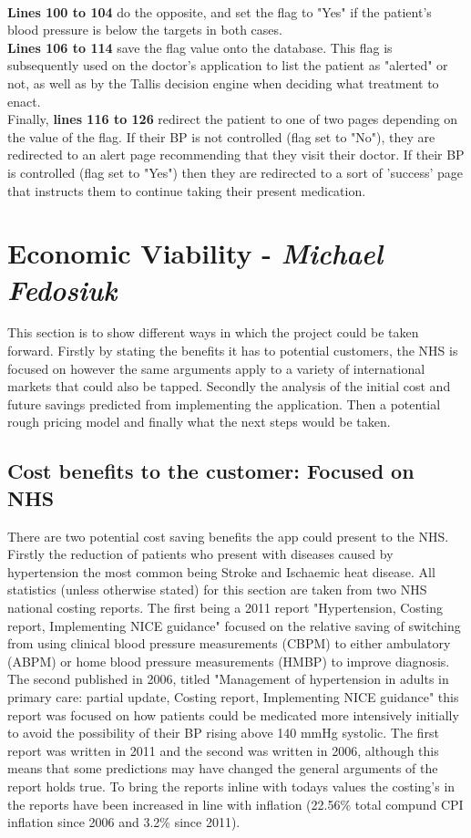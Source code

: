 \documentclass[11pt]{article}
\begin{document}
\\
\textbf{Lines 100 to 104} do the opposite, and set the flag to "Yes" if the patient's blood pressure is below the targets in both cases.
\\
\textbf{Lines 106 to 114} save the flag value onto the database. This flag is subsequently used on the doctor's application to list the patient as "alerted" or not, as well as by the Tallis decision engine when deciding what treatment to enact.
\\
Finally, \textbf{lines 116 to 126} redirect the patient to one of two pages depending on the value of the flag. If their BP is not controlled (flag set to "No"), they are redirected to an alert page recommending that they visit their doctor. If their BP is controlled (flag set to "Yes") then they are redirected to a sort of 'success' page that instructs them to continue taking their present medication.


\section{Economic Viability - \textit{Michael Fedosiuk}}
This section is to show different ways in which the project could be taken forward. Firstly by stating the benefits it has to potential customers, the NHS is focused on however the same arguments apply to a variety of international markets that could also be tapped. Secondly the analysis of the initial cost and future savings predicted from implementing the application. Then a potential rough pricing model and finally what the next steps would be taken.

\subsection{Cost benefits to the customer: Focused on NHS}
There are two potential cost saving benefits the app could present to the NHS. Firstly the reduction of patients who present with diseases caused by hypertension the most common being Stroke and Ischaemic heat disease. All statistics (unless otherwise stated) for this section are taken from two NHS national costing reports. The first being a 2011 report "Hypertension, Costing report, Implementing NICE guidance" \cite{costhome} focused on the relative saving of switching from using clinical blood pressure measurements (CBPM) to either ambulatory (ABPM) or home blood pressure measurements (HMBP) to improve diagnosis. The second published in 2006, titled "Management of hypertension in adults in primary care: partial update, Costing report, Implementing NICE guidance" \cite{costdrug} this report was focused on how patients could be medicated more intensively initially to avoid the possibility of their BP rising above 140 mmHg systolic. The first report was written in 2011 and the second was written in 2006, although this means that some predictions may have changed the general arguments of the report holds true. To bring the reports inline with todays values the costing's in the reports have been increased in line with inflation (22.56\% total compund CPI inflation since 2006 and 3.2\% since 2011). 
\end{document}

